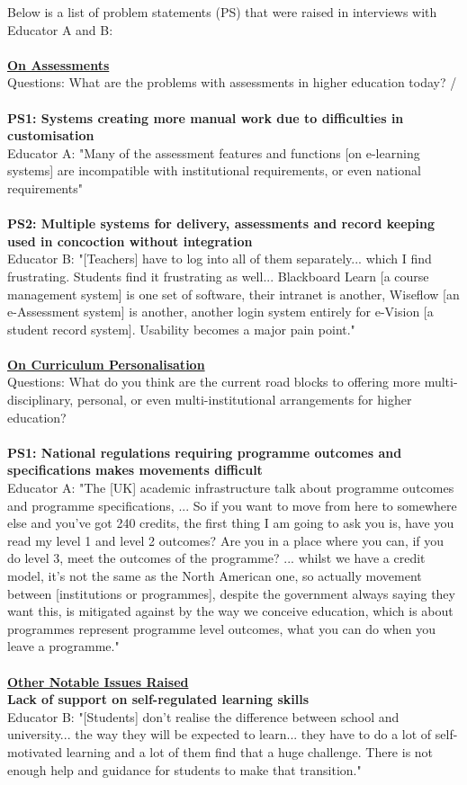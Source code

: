 Below is a list of problem statements (PS) that were raised in interviews with Educator A and B:\\
\\
\underline{\textbf{On Assessments}}
\\
Questions: What are the problems with assessments in higher education today? / \\
\\
\textbf{PS1: Systems creating more manual work due to difficulties in customisation}\\
Educator A: "Many of the assessment features and functions [on e-learning systems] are incompatible 
with institutional requirements, or even national requirements"\\
\\
\textbf{PS2: Multiple systems for delivery, assessments and record keeping used in concoction without integration}\\
Educator B: "[Teachers] have to log into all of them separately... which I find frustrating. Students find
it frustrating as well... Blackboard Learn [a course management system] is one set of software, their 
intranet is another, Wiseflow [an e-Assessment system] is another, another login system entirely for 
e-Vision [a student record system]. Usability becomes a major pain point."\\
\\
\underline{\textbf{On Curriculum Personalisation}}
\\
Questions: What do you think are the current road blocks to offering more multi-disciplinary, personal, 
or even multi-institutional arrangements for higher education?
\\\\
\textbf{PS1: National regulations requiring programme outcomes and specifications makes movements 
difficult}\\
Educator A: "The [UK] academic infrastructure talk about programme outcomes and programme specifications,
... So if you want to move from here to somewhere else and you’ve got 240 credits, the first thing I am 
going to ask you is, have you read my level 1 and level 2 outcomes? Are you in a place where you can, 
if you do level 3, meet the outcomes of the programme? ... whilst we have a credit model, it’s not the 
same as the North American one, so actually movement between [institutions or programmes], despite the 
government always saying they want this, is mitigated against by the way we conceive education, 
which is about programmes represent programme level outcomes, what you can do when you leave a programme."
\\\\
\underline{\textbf{Other Notable Issues Raised}}
\\
\textbf{Lack of support on self-regulated learning skills}\\
Educator B: "[Students] don't realise the difference between school and university... the way they will
be expected to learn... they have to do a lot of self-motivated learning and a lot of them find that a 
huge challenge. There is not enough help and guidance for students to make that transition."

